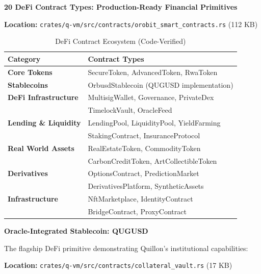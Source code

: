 \documentclass[11pt,a4paper]{article}
\begin{document}
\textbf{20 DeFi Contract Types: Production-Ready Financial Primitives}

\textbf{Location:} \texttt{crates/q-vm/src/contracts/orobit\_smart\_contracts.rs} (112 KB)

\begin{table}[h]
\centering
\small
\begin{tabular}{@{}ll@{}}
\toprule
\textbf{Category} & \textbf{Contract Types} \\ \midrule
\textbf{Core Tokens} & SecureToken, AdvancedToken, RwaToken \\
\textbf{Stablecoins} & OrbusdStablecoin (QUGUSD implementation) \\
\textbf{DeFi Infrastructure} & MultisigWallet, Governance, PrivateDex \\
 & TimelockVault, OracleFeed \\
\textbf{Lending \& Liquidity} & LendingPool, LiquidityPool, YieldFarming \\
 & StakingContract, InsuranceProtocol \\
\textbf{Real World Assets} & RealEstateToken, CommodityToken \\
 & CarbonCreditToken, ArtCollectibleToken \\
\textbf{Derivatives} & OptionsContract, PredictionMarket \\
 & DerivativesPlatform, SyntheticAssets \\
\textbf{Infrastructure} & NftMarketplace, IdentityContract \\
 & BridgeContract, ProxyContract \\
\bottomrule
\end{tabular}
\caption{DeFi Contract Ecosystem (Code-Verified)}
\end{table}

\textbf{Oracle-Integrated Stablecoin: QUGUSD}

The flagship DeFi primitive demonstrating Quillon's institutional capabilities:

\textbf{Location:} \texttt{crates/q-vm/src/contracts/collateral\_vault.rs} (17 KB)
\end{document}

